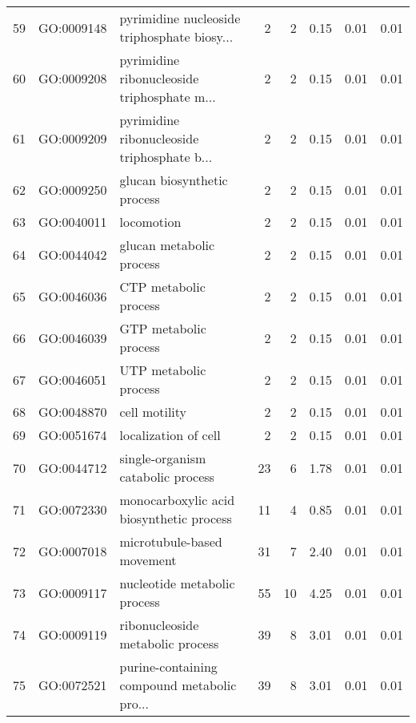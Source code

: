 \begin{table}[ht]
\begin{tabular}{rllrrrrr}
  59 & GO:0009148 & pyrimidine nucleoside triphosphate biosy... &   2 &   2 & 0.15 & 0.01 & 0.01 \\ 
  60 & GO:0009208 & pyrimidine ribonucleoside triphosphate m... &   2 &   2 & 0.15 & 0.01 & 0.01 \\ 
  61 & GO:0009209 & pyrimidine ribonucleoside triphosphate b... &   2 &   2 & 0.15 & 0.01 & 0.01 \\ 
  62 & GO:0009250 & glucan biosynthetic process &   2 &   2 & 0.15 & 0.01 & 0.01 \\ 
  63 & GO:0040011 & locomotion &   2 &   2 & 0.15 & 0.01 & 0.01 \\ 
  64 & GO:0044042 & glucan metabolic process &   2 &   2 & 0.15 & 0.01 & 0.01 \\ 
  65 & GO:0046036 & CTP metabolic process &   2 &   2 & 0.15 & 0.01 & 0.01 \\ 
  66 & GO:0046039 & GTP metabolic process &   2 &   2 & 0.15 & 0.01 & 0.01 \\ 
  67 & GO:0046051 & UTP metabolic process &   2 &   2 & 0.15 & 0.01 & 0.01 \\ 
  68 & GO:0048870 & cell motility &   2 &   2 & 0.15 & 0.01 & 0.01 \\ 
  69 & GO:0051674 & localization of cell &   2 &   2 & 0.15 & 0.01 & 0.01 \\ 
  70 & GO:0044712 & single-organism catabolic process &  23 &   6 & 1.78 & 0.01 & 0.01 \\ 
  71 & GO:0072330 & monocarboxylic acid biosynthetic process &  11 &   4 & 0.85 & 0.01 & 0.01 \\ 
  72 & GO:0007018 & microtubule-based movement &  31 &   7 & 2.40 & 0.01 & 0.01 \\ 
  73 & GO:0009117 & nucleotide metabolic process &  55 &  10 & 4.25 & 0.01 & 0.01 \\ 
  74 & GO:0009119 & ribonucleoside metabolic process &  39 &   8 & 3.01 & 0.01 & 0.01 \\ 
  75 & GO:0072521 & purine-containing compound metabolic pro... &  39 &   8 & 3.01 & 0.01 & 0.01 \\ 
   \hline
\end{tabular}
\end{table}

